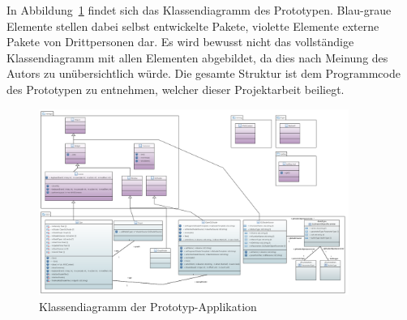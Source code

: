 In Abbildung~\ref{fig:class-diagram:prototype} findet sich das Klassendiagramm
des Prototypen.  Blau-graue Elemente stellen dabei selbst entwickelte Pakete,
violette Elemente externe Pakete von Drittpersonen dar. Es wird bewusst
nicht das vollständige Klassendiagramm mit allen Elementen abgebildet, da dies
nach Meinung des Autors zu unübersichtlich würde. Die gesamte Struktur ist dem
Programmcode des Prototypen zu entnehmen, welcher dieser Projektarbeit
beiliegt.

\begin{figure}[H]
    \centering
    \includegraphics[width=0.9\textwidth]{img/prototype_class_diagram.png}
    \caption{Klassendiagramm der
        Prototyp-Applikation\protect\footnotemark}\label{fig:class-diagram:prototype}
\end{figure}
